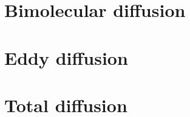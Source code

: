 \newcommand{\A}{\ensuremath{\mathtt{A_{s,j_m}}}}%
\section{Bimolecular diffusion}


\section{Eddy diffusion}


\section{Total diffusion}

